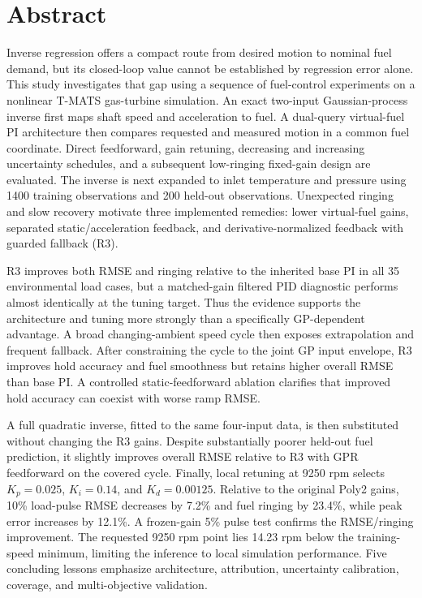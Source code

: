 \documentclass[11pt,a4paper,oneside]{report}
\begin{document}
\chapter*{Abstract}
Inverse regression offers a compact route from desired motion to nominal fuel demand, but its closed-loop value cannot be established by regression error alone. This study investigates that gap using a sequence of fuel-control experiments on a nonlinear T-MATS gas-turbine simulation. An exact two-input Gaussian-process inverse first maps shaft speed and acceleration to fuel. A dual-query virtual-fuel PI architecture then compares requested and measured motion in a common fuel coordinate. Direct feedforward, gain retuning, decreasing and increasing uncertainty schedules, and a subsequent low-ringing fixed-gain design are evaluated. The inverse is next expanded to inlet temperature and pressure using 1400 training observations and 200 held-out observations. Unexpected ringing and slow recovery motivate three implemented remedies: lower virtual-fuel gains, separated static/acceleration feedback, and derivative-normalized feedback with guarded fallback (R3).

R3 improves both RMSE and ringing relative to the inherited base PI in all 35 environmental load cases, but a matched-gain filtered PID diagnostic performs almost identically at the tuning target. Thus the evidence supports the architecture and tuning more strongly than a specifically GP-dependent advantage. A broad changing-ambient speed cycle then exposes extrapolation and frequent fallback. After constraining the cycle to the joint GP input envelope, R3 improves hold accuracy and fuel smoothness but retains higher overall RMSE than base PI. A controlled static-feedforward ablation clarifies that improved hold accuracy can coexist with worse ramp RMSE.

A full quadratic inverse, fitted to the same four-input data, is then substituted without changing the R3 gains. Despite substantially poorer held-out fuel prediction, it slightly improves overall RMSE relative to R3 with GPR feedforward on the covered cycle. Finally, local retuning at 9250 rpm selects $K_p=0.025$, $K_i=0.14$, and $K_d=0.00125$. Relative to the original Poly2 gains, 10\% load-pulse RMSE decreases by 7.2\% and fuel ringing by 23.4\%, while peak error increases by 12.1\%. A frozen-gain 5\% pulse test confirms the RMSE/ringing improvement. The requested 9250 rpm point lies 14.23 rpm below the training-speed minimum, limiting the inference to local simulation performance. Five concluding lessons emphasize architecture, attribution, uncertainty calibration, coverage, and multi-objective validation.
\end{document}

